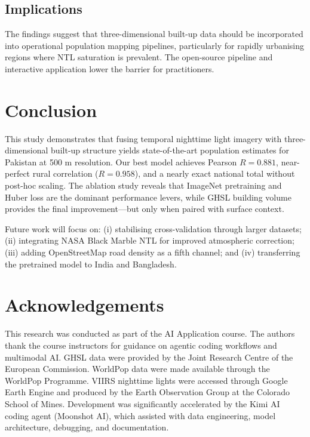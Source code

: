 \documentclass[12pt,a4paper]{article}
\begin{document}
\subsection{Implications}
\label{subsec:implications}

The findings suggest that three-dimensional built-up data should be incorporated into operational population mapping pipelines, particularly for rapidly urbanising regions where NTL saturation is prevalent. The open-source pipeline and interactive application lower the barrier for practitioners.

\section{Conclusion}
\label{sec:conclusion}

This study demonstrates that fusing temporal nighttime light imagery with three-dimensional built-up structure yields state-of-the-art population estimates for Pakistan at 500 m resolution. Our best model achieves Pearson $R = 0.881$, near-perfect rural correlation ($R = 0.958$), and a nearly exact national total without post-hoc scaling. The ablation study reveals that ImageNet pretraining and Huber loss are the dominant performance levers, while GHSL building volume provides the final improvement---but only when paired with surface context.

Future work will focus on: (i) stabilising cross-validation through larger datasets; (ii) integrating NASA Black Marble NTL for improved atmospheric correction; (iii) adding OpenStreetMap road density as a fifth channel; and (iv) transferring the pretrained model to India and Bangladesh.

\section*{Acknowledgements}

This research was conducted as part of the AI Application course. The authors thank the course instructors for guidance on agentic coding workflows and multimodal AI. GHSL data were provided by the Joint Research Centre of the European Commission. WorldPop data were made available through the WorldPop Programme. VIIRS nighttime lights were accessed through Google Earth Engine and produced by the Earth Observation Group at the Colorado School of Mines. Development was significantly accelerated by the Kimi AI coding agent (Moonshot AI), which assisted with data engineering, model architecture, debugging, and documentation.
\end{document}

